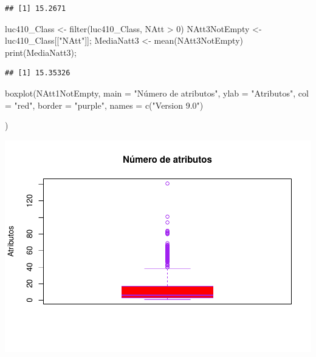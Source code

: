 \documentclass[
]{article}
\newenvironment{Shaded}{\begin{snugshade}}{\end{snugshade}}
\newcommand{\AttributeTok}[1]{\textcolor[rgb]{0.77,0.63,0.00}{#1}}
\newcommand{\DecValTok}[1]{\textcolor[rgb]{0.00,0.00,0.81}{#1}}
\newcommand{\FunctionTok}[1]{\textcolor[rgb]{0.00,0.00,0.00}{#1}}
\newcommand{\NormalTok}[1]{#1}
\newcommand{\OtherTok}[1]{\textcolor[rgb]{0.56,0.35,0.01}{#1}}
\newcommand{\SpecialCharTok}[1]{\textcolor[rgb]{0.00,0.00,0.00}{#1}}
\newcommand{\StringTok}[1]{\textcolor[rgb]{0.31,0.60,0.02}{#1}}
\begin{document}
\begin{verbatim}
## [1] 15.2671
\end{verbatim}

\begin{Shaded}
\begin{Highlighting}[]
\NormalTok{ luc410\_Class }\OtherTok{\textless{}{-}} \FunctionTok{filter}\NormalTok{(luc410\_Class, NAtt }\SpecialCharTok{\textgreater{}} \DecValTok{0}\NormalTok{)}
\NormalTok{ NAtt3NotEmpty }\OtherTok{\textless{}{-}}\NormalTok{ luc410\_Class[[}\StringTok{"NAtt"}\NormalTok{]];}
\NormalTok{ MediaNatt3 }\OtherTok{\textless{}{-}} \FunctionTok{mean}\NormalTok{(NAtt3NotEmpty)}
 \FunctionTok{print}\NormalTok{(MediaNatt3);}
\end{Highlighting}
\end{Shaded}

\begin{verbatim}
## [1] 15.35326
\end{verbatim}

\begin{Shaded}
\begin{Highlighting}[]
 \FunctionTok{boxplot}\NormalTok{(NAtt1NotEmpty,}
        \AttributeTok{main =} \StringTok{"Número de atributos"}\NormalTok{,}
        \AttributeTok{ylab =} \StringTok{"Atributos"}\NormalTok{,}
        \AttributeTok{col =} \StringTok{"red"}\NormalTok{,}
        \AttributeTok{border =} \StringTok{"purple"}\NormalTok{,}
        \AttributeTok{names =} \FunctionTok{c}\NormalTok{(}\StringTok{"Version 9.0"}\NormalTok{)}
        
\NormalTok{        )}
\end{Highlighting}
\end{Shaded}

\includegraphics{report_files/figure-latex/unnamed-chunk-10-1.pdf}
\end{document}
